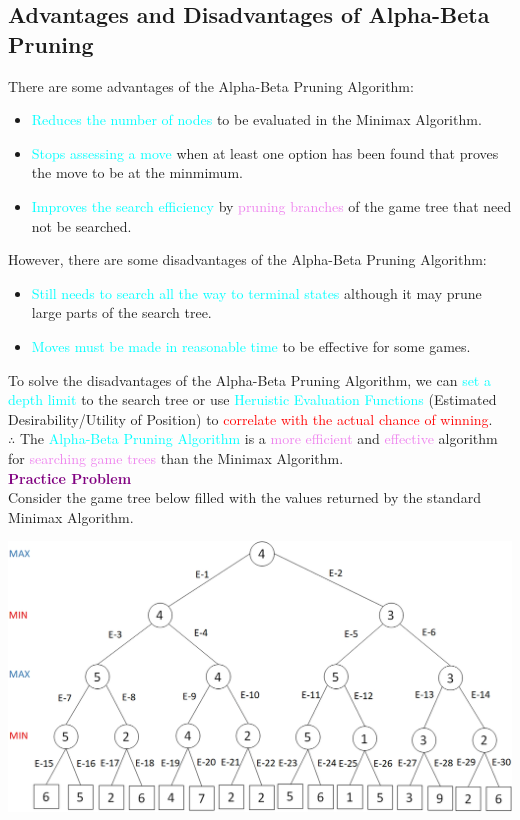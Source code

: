 \documentclass{book}
\begin{document}
\subsection{Advantages and Disadvantages of Alpha-Beta Pruning}
There are some advantages of the Alpha-Beta Pruning Algorithm:
\begin{itemize}
    \item \textcolor{cyan}{Reduces the number of nodes} to be evaluated in the Minimax Algorithm.
    \item \textcolor{cyan}{Stops assessing a move} when at least one option has been found that proves the move to be at the minmimum.
    \item \textcolor{cyan}{Improves the search efficiency} by \textcolor{violet}{pruning branches} of the game tree that need not be searched.
\end{itemize}
However, there are some disadvantages of the Alpha-Beta Pruning Algorithm:
\begin{itemize}
    \item \textcolor{cyan}{Still needs to search all the way to terminal states} although it may prune large parts of the search tree.
    \item \textcolor{cyan}{Moves must be made in reasonable time} to be effective for some games.
\end{itemize}
To solve the disadvantages of the Alpha-Beta Pruning Algorithm, we can \textcolor{cyan}{set a depth limit} to the search tree or use \textcolor{cyan}{Heruistic Evaluation Functions} (Estimated Desirability/Utility of Position) to \textcolor{red}{correlate with the actual chance of winning}.\\
$\therefore$ The \textcolor{cyan}{Alpha-Beta Pruning Algorithm} is a \textcolor{violet}{more efficient} and \textcolor{violet}{effective} algorithm for \textcolor{violet}{searching game trees} than the Minimax Algorithm.\\
\vfill
\textbf{\textcolor{purple}{\Large{Practice Problem}}}\\
Consider the game tree below filled with the values returned by the standard Minimax Algorithm.\\
\begin{center}
    \includegraphics[scale=0.2]{chapter 10/ch10_figure13.jpeg}
\end{center}
\end{document}
